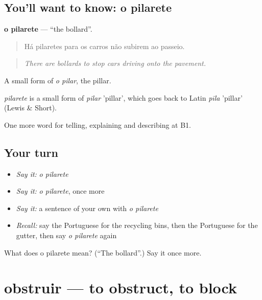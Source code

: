 \subsection*{You'll want to know: o pilarete}
\textbf{o pilarete} — \textquotedblleft{}the bollard\textquotedblright{}.

\begin{quote}
Há pilaretes para os carros não subirem ao passeio.
\end{quote}

\begin{quote}
\emph{There are bollards to stop cars driving onto the pavement.}
\end{quote}

A small form of \emph{o pilar}, the pillar.

\begin{cousinweb}
\emph{pilarete} is a small form of \emph{pilar} 'pillar', which goes back to Latin \emph{pīla} 'pillar' (Lewis \& Short).
\end{cousinweb}

\begin{grammarlens}[title={What you've built}]
One more word for telling, explaining and describing at B1.
\end{grammarlens}

\subsection*{Your turn}
\begin{itemize}
\raggedright
  \item \emph{Say it:} \emph{o pilarete}
  \item \emph{Say it:} \emph{o pilarete}, once more
  \item \emph{Say it:} a sentence of your own with \emph{o pilarete}
  \item \emph{Recall:} say the Portuguese for the recycling bins, then the Portuguese for the gutter, then say \emph{o pilarete} again
\end{itemize}

\begin{tcolorbox}[breakable,colback=teal!4,colframe=teal!35!black,title={Before you move on}]
What does o pilarete mean? (\textquotedblleft{}The bollard\textquotedblright{}.) Say it once more.
\end{tcolorbox}
\section[obstruir]{obstruir — to obstruct, to block}

